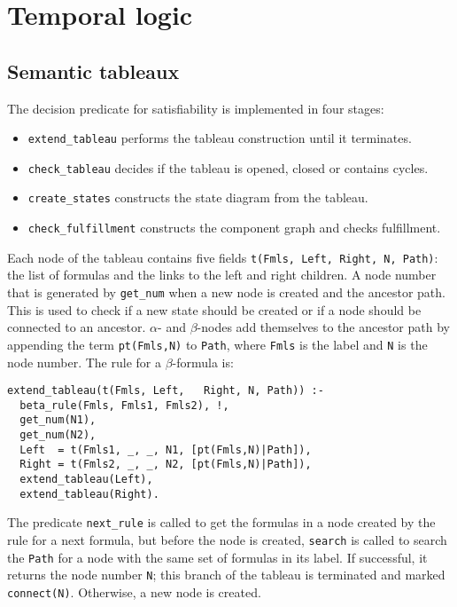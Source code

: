 \documentclass[11pt]{article}
\newcommand*{\p}[1]{\textup{\texttt{#1}}}
\begin{document}
\section{Temporal logic}

\subsection{Semantic tableaux}\label{s.tabtl}

The decision predicate for
satisfiability is implemented in four stages:
\begin{itemize}
\item \p{extend\_tableau} performs the tableau
construction until it terminates.
\item \p{check\_tableau} decides if the tableau is opened,
closed or contains cycles.
\item \p{create\_states} constructs the state diagram
from the tableau.
\item \p{check\_fulfillment}
constructs the component graph and checks fulfillment.
\end{itemize}

Each node of the tableau contains five fields \p{t(Fmls, Left, Right, N,
Path)}: the list of formulas and the links to the left and right
children. A node number that is generated by \p{get\_num} when a new
node is created and the ancestor path. This is used to check if a new
state should be created or if a node should be connected to an ancestor.
$\alpha$- and $\beta$-nodes add themselves to the ancestor path by
appending the term \p{pt(Fmls,N)} to \p{Path}, where \p{Fmls} is the
label and \p{N} is the node number. The rule for a $\beta$-formula is:

\begin{verbatim}
extend_tableau(t(Fmls, Left,   Right, N, Path)) :-
  beta_rule(Fmls, Fmls1, Fmls2), !,
  get_num(N1),
  get_num(N2),
  Left  = t(Fmls1, _, _, N1, [pt(Fmls,N)|Path]),
  Right = t(Fmls2, _, _, N2, [pt(Fmls,N)|Path]),
  extend_tableau(Left),
  extend_tableau(Right).
\end{verbatim}

The predicate \p{next\_rule} is called to get the formulas in a node
created by the rule for a next formula, but before the node is
created, \p{search} is called to search the \p{Path} for a node with the
same set of formulas in its label. If successful, it returns the node
number \p{N}; this branch of the tableau is terminated and marked
\p{connect(N)}. Otherwise, a new node is created.
\end{document}
